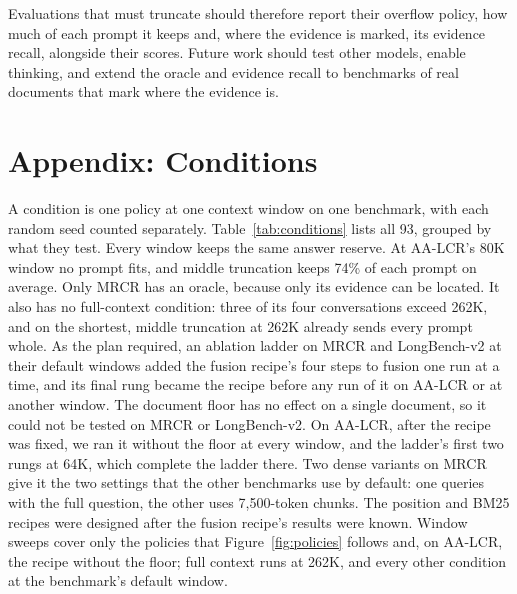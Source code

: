 \documentclass[letterpaper]{article} %
\newcommand{\recipe}{fusion recipe}
\begin{document}
Evaluations that must truncate should therefore report their overflow policy, how much of each prompt it keeps and, where the evidence is marked, its evidence recall, alongside their scores. Future work should test other models, enable thinking, and extend the oracle and evidence recall to benchmarks of real documents that mark where the evidence is.



\appendix
\section{Appendix: Conditions}
A condition is one policy at one context window on one benchmark, with each random seed counted separately. Table~\ref{tab:conditions} lists all 93, grouped by what they test. Every window keeps the same answer reserve. At AA-LCR's 80K window no prompt fits, and middle truncation keeps 74\% of each prompt on average. Only MRCR has an oracle, because only its evidence can be located. It also has no full-context condition: three of its four conversations exceed 262K, and on the shortest, middle truncation at 262K already sends every prompt whole. As the plan required, an ablation ladder on MRCR and LongBench-v2 at their default windows added the \recipe's four steps to fusion one run at a time, and its final rung became the recipe before any run of it on AA-LCR or at another window. The document floor has no effect on a single document, so it could not be tested on MRCR or LongBench-v2. On AA-LCR, after the recipe was fixed, we ran it without the floor at every window, and the ladder's first two rungs at 64K, which complete the ladder there. Two dense variants on MRCR give it the two settings that the other benchmarks use by default: one queries with the full question, the other uses 7,500-token chunks. The position and BM25 recipes were designed after the \recipe's results were known. Window sweeps cover only the policies that Figure~\ref{fig:policies} follows and, on AA-LCR, the recipe without the floor; full context runs at 262K, and every other condition at the benchmark's default window.
\end{document}
